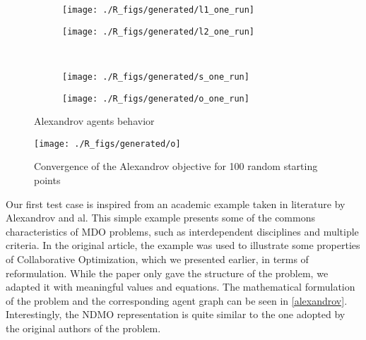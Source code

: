 \begin{figure}[]
\centering
  	\begin{subfigure}[b]{0.4\textwidth}
		\centering
		\texttt{[image: ./R\_figs/generated/l1\_one\_run]}
		\label{alexandrov_res_one:l1}
	\end{subfigure}
	\begin{subfigure}[b]{0.4\textwidth}
		\centering
		\texttt{[image: ./R\_figs/generated/l2\_one\_run]}
		\label{alexandrov_res_one:l2}
	\end{subfigure}
	\vspace{-20pt}
	\\
	\begin{subfigure}[b]{0.4\textwidth}
		\centering
		\texttt{[image: ./R\_figs/generated/s\_one\_run]}
		\label{alexandrov_res_one:s}
	\end{subfigure}
	\begin{subfigure}[b]{0.4\textwidth}
		\centering
		\texttt{[image: ./R\_figs/generated/o\_one\_run]}
		\label{alexandrov_res_one:o}
	\end{subfigure}
	
	\caption{Alexandrov agents behavior}
	\label{alexandrov_res_one}

\end{figure}

\begin{wrapfigure}{R}{0.4\textwidth}
    \texttt{[image: ./R\_figs/generated/o]}
	\caption{Convergence of the Alexandrov objective for 100 random starting points}
	\label{alexandrov_res}
\end{wrapfigure}

Our first test case is inspired from an academic example taken in literature by Alexandrov and al\cite{alexandrov2002analytical}. This simple example presents some of the commons characteristics of MDO problems, such as interdependent disciplines and multiple criteria. In the original article, the example was used to illustrate some properties of Collaborative Optimization, which we presented earlier, in terms of reformulation. While the paper only gave the structure of the problem, we adapted it with meaningful values and equations.
The mathematical formulation of the problem and the corresponding agent graph can be seen in \figurename \ref{alexandrov}. Interestingly, the NDMO representation is quite similar to the one adopted by the original authors of the problem.

